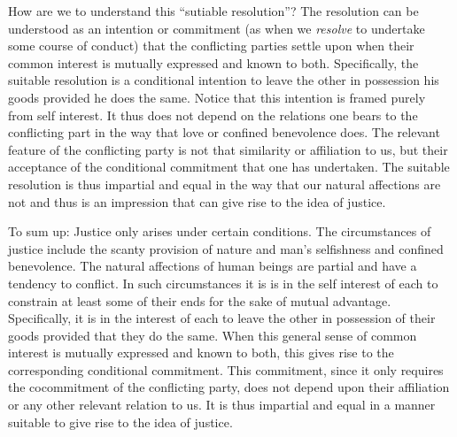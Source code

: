 How are we to understand this ``sutiable resolution''? The resolution can be understood as an intention or commitment (as when we \emph{resolve} to undertake some course of conduct) that the conflicting parties settle upon when their common interest is mutually expressed and known to both. Specifically, the suitable resolution is a conditional intention to leave the other in possession his goods provided he does the same. Notice that this intention is framed purely from self interest. It thus does not depend on the relations one bears to the conflicting part in the way that love or confined benevolence does. The relevant feature of the conflicting party is not that similarity or affiliation to us, but their acceptance of the conditional commitment that one has undertaken. The suitable resolution is thus impartial and equal in the way that our natural affections are not and thus is an impression that can give rise to the idea of justice.

To sum up: Justice only arises under certain conditions. The circumstances of justice include the scanty provision of nature and man's selfishness and confined benevolence. The natural affections of human beings are partial and have a tendency to conflict. In such circumstances it is is in the self interest of each to constrain at least some of their ends for the sake of mutual advantage. Specifically, it is in the interest of each to leave the other in possession of their goods provided that they do the same. When this general sense of common interest is mutually expressed and known to both, this gives rise to the corresponding conditional commitment. This commitment, since it only requires the cocommitment of the conflicting party, does not depend upon their affiliation or any other relevant relation to us. It is thus impartial and equal in a manner suitable to give rise to the idea of justice.

% 


